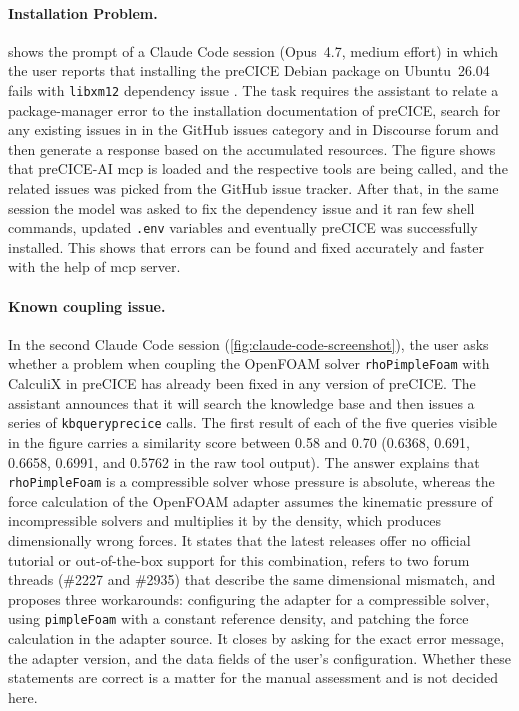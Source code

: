 \documentclass[
  numbers=noenddot,
  english,
  a4paper,
  twoside,
  bibliography=totoc,
  headsepline,
  cleardoublepage=empty,
  parskip=half,
  draft=false
]{scrbook}
\theoremstyle{break}
\renewcommand{\_}{\textunderscore\allowbreak}
\begin{document}
\paragraph{Installation Problem.}
 shows the prompt of a Claude Code session (Opus~4.7, medium
effort) in which the user reports that installing the preCICE Debian package on
Ubuntu~26.04 fails with \texttt{libxm12} dependency issue .
The task requires the assistant to relate a package-manager error to the installation
documentation of preCICE, search for any existing issues in in the GitHub issues category and in Discourse 
forum and then generate a response based on the accumulated resources. The figure shows that preCICE-AI \gls{mcp} 
is loaded and the respective tools are being called, 
and the related issues was picked from the GitHub issue tracker. After that, in the same session the model was 
asked to fix the dependency issue and it ran few shell commands, updated \texttt{.env} variables and 
eventually preCICE was successfully installed. This shows that errors can be found and fixed accurately and faster 
with the help of \gls{mcp} server.

\paragraph{Known coupling issue.}
In the second Claude Code session (\cref{fig:claude-code-screenshot}), the user asks whether a
problem when coupling the OpenFOAM solver \texttt{rhoPimpleFoam} with CalculiX in preCICE has
already been fixed in any version of preCICE.
The assistant announces that it will search the knowledge base and then issues a series of
\texttt{kb\_query\_precice} calls.
The first result of each of the five queries visible in the figure carries a similarity score
between 0.58 and 0.70 (0.6368, 0.691, 0.6658, 0.6991, and 0.5762 in the raw tool output).
The answer explains that \texttt{rhoPimpleFoam} is a compressible solver whose pressure is
absolute, whereas the force calculation of the OpenFOAM adapter assumes the kinematic pressure of
incompressible solvers and multiplies it by the density, which produces dimensionally wrong
forces.
It states that the latest releases offer no official tutorial or out-of-the-box support for this
combination, refers to two forum threads (\#2227 and \#2935) that describe the same dimensional
mismatch, and proposes three workarounds: configuring the adapter for a compressible solver,
using \texttt{pimpleFoam} with a constant reference density, and patching the force calculation
in the adapter source.
It closes by asking for the exact error message, the adapter version, and the data fields of the
user's configuration.
Whether these statements are correct is a matter for the manual assessment and is not decided
here.
\end{document}
